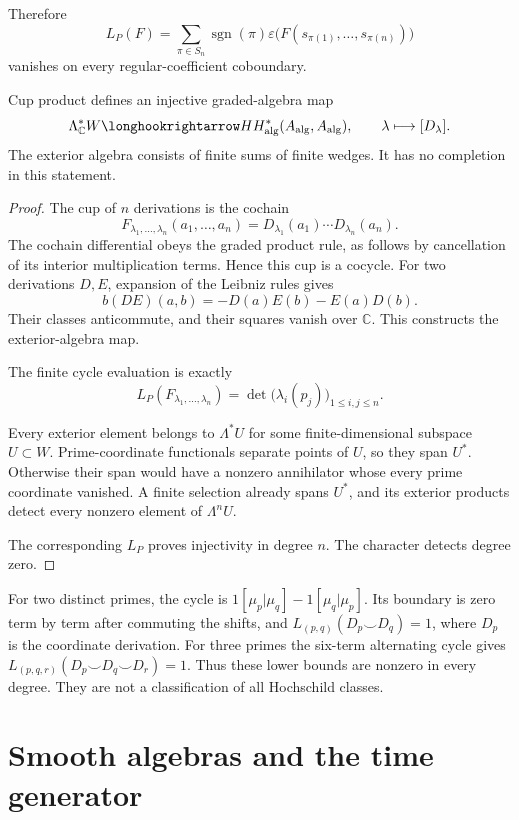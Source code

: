 Therefore
\[
 L_P(F)=\sum_{\pi\in S_n}\operatorname{sgn}(\pi)
       \varepsilon\bigl(F(s_{\pi(1)},\ldots,s_{\pi(n)})\bigr)
\]
vanishes on every regular-coefficient coboundary.

\begin{theorem}
\label{v4-arith:traces:exterior-gauge}
Cup product defines an injective graded-algebra map
\[
 \Lambda_{\mathbb C}^*W
   \longhookrightarrow
 HH^*_{\mathrm{alg}}(A_{\mathrm{alg}},A_{\mathrm{alg}}),
 \qquad \lambda\longmapsto[D_\lambda].
\]
The exterior algebra consists of finite sums of finite wedges. It has no
completion in this statement.
\end{theorem}
\begin{proof}
The cup of $n$ derivations is the cochain
\[
 F_{\lambda_1,\ldots,\lambda_n}(a_1,\ldots,a_n)
   =D_{\lambda_1}(a_1)\cdots D_{\lambda_n}(a_n).
\]
The cochain differential obeys the graded product rule, as follows by
cancellation of its interior multiplication terms. Hence this cup is a
cocycle. For two derivations $D,E$, expansion of the Leibniz rules gives
\[
 b(DE)(a,b)=-D(a)E(b)-E(a)D(b).
\]
Their classes anticommute, and their squares vanish over $\mathbb C$. This
constructs the exterior-algebra map.

The finite cycle evaluation is exactly
\[
 L_P(F_{\lambda_1,\ldots,\lambda_n})
   =\det\bigl(\lambda_i(p_j)\bigr)_{1\leq i,j\leq n}.
\]

Every exterior element belongs to $\Lambda^*U$ for some finite-dimensional
subspace $U\subset W$. Prime-coordinate functionals separate points of $U$,
so they span $U^*$. Otherwise their span would have a nonzero annihilator
whose every prime coordinate vanished. A finite selection already spans
$U^*$, and its exterior products detect every nonzero element of
$\Lambda^nU$.

The corresponding $L_P$ proves injectivity in degree $n$. The character
detects degree zero.
\end{proof}

For two distinct primes, the cycle is $1[\mu_p|\mu_q]-1[\mu_q|\mu_p]$. Its
boundary is zero term by term after commuting the shifts, and
$L_{(p,q)}(D_p\smile D_q)=1$, where $D_p$ is the coordinate derivation. For
three primes the six-term alternating cycle gives $L_{(p,q,r)}(D_p\smile
D_q\smile D_r)=1$. Thus these lower bounds are nonzero in every degree. They
are not a classification of all Hochschild classes.

\section{Smooth algebras and the time generator}

